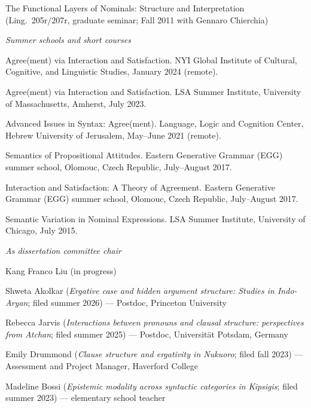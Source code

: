 \documentclass[12pt]{article}
\begin{document}
\ind The Functional Layers of Nominals: Structure and Interpretation (Ling.~205r/207r, graduate seminar; Fall 2011 with Gennaro Chierchia)

\medskip

\noindent\emph{Summer schools and short courses\vspace{0.05in}}

\ind Agree(ment) via Interaction and Satisfaction. NYI Global Institute of Cultural, Cognitive, and Linguistic Studies, January 2024 (remote).

\ind Agree(ment) via Interaction and Satisfaction. LSA Summer Institute, University of Massachusetts, Amherst, July 2023.

\ind Advanced Issues in Syntax: Agree(ment). Language, Logic and Cognition Center, Hebrew University of Jerusalem, May--June 2021 (remote).

\ind Semantics of Propositional Attitudes. Eastern Generative Grammar (EGG) summer school, Olomouc, Czech Republic, July--August 2017.

\ind Interaction and Satisfaction: A Theory of Agreement. Eastern Generative Grammar (EGG) summer school, Olomouc, Czech Republic, July--August 2017.

\ind Semantic Variation in Nominal Expressions. LSA Summer Institute, University of Chicago, July 2015.

\bigskip



\newpage

\medskip

\noindent\emph{As dissertation committee chair\vspace{0.05in}}


\ind Kang Franco Liu (in progress)


\ind Shweta Akolkar (\emph{Ergative case and hidden argument structure: Studies in Indo-Aryan}; filed summer 2026) --- Postdoc, Princeton University


\ind Rebecca Jarvis (\emph{Interactions between pronouns and clausal structure: perspectives from Atchan}; filed summer 2025) --- Postdoc, Universit\"at Potsdam, Germany

\ind Emily Drummond (\emph{Clause structure and ergativity in Nukuoro}; filed fall 2023) ---  Assessment and Project Manager, Haverford College

\ind Madeline Bossi (\emph{Epistemic modality across syntactic categories in Kipsigis}; filed summer 2023) ---  elementary school teacher
\end{document}
